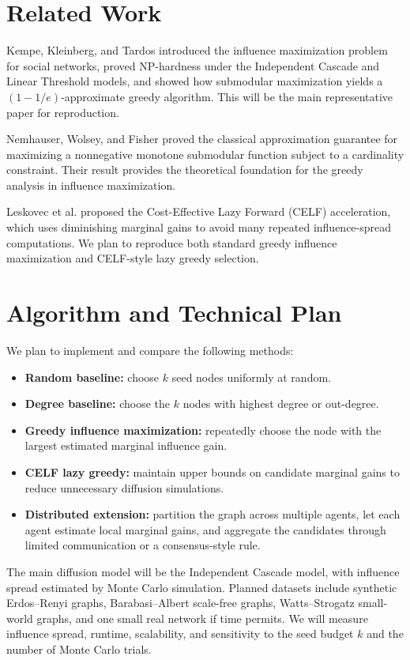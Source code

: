 \documentclass[10pt]{article}
\begin{document}
\section{Related Work}

Kempe, Kleinberg, and Tardos introduced the influence maximization problem for
social networks, proved NP-hardness under the Independent Cascade and Linear
Threshold models, and showed how submodular maximization yields a
$(1-1/e)$-approximate greedy algorithm. This will be the main representative
paper for reproduction.

Nemhauser, Wolsey, and Fisher proved the classical approximation guarantee for
maximizing a nonnegative monotone submodular function subject to a cardinality
constraint. Their result provides the theoretical foundation for the greedy
analysis in influence maximization.

Leskovec et al. proposed the Cost-Effective Lazy Forward (CELF) acceleration,
which uses diminishing marginal gains to avoid many repeated influence-spread
computations. We plan to reproduce both standard greedy influence maximization
and CELF-style lazy greedy selection.

\section{Algorithm and Technical Plan}

We plan to implement and compare the following methods:
\begin{itemize}
    \item \textbf{Random baseline:} choose $k$ seed nodes uniformly at random.
    \item \textbf{Degree baseline:} choose the $k$ nodes with highest degree or
    out-degree.
    \item \textbf{Greedy influence maximization:} repeatedly choose the node
    with the largest estimated marginal influence gain.
    \item \textbf{CELF lazy greedy:} maintain upper bounds on candidate
    marginal gains to reduce unnecessary diffusion simulations.
    \item \textbf{Distributed extension:} partition the graph across multiple
    agents, let each agent estimate local marginal gains, and aggregate the
    candidates through limited communication or a consensus-style rule.
\end{itemize}

The main diffusion model will be the Independent Cascade model, with influence
spread estimated by Monte Carlo simulation. Planned datasets include synthetic
Erdos--Renyi graphs, Barabasi--Albert scale-free graphs, Watts--Strogatz
small-world graphs, and one small real network if time permits. We will measure
influence spread, runtime, scalability, and sensitivity to the seed budget $k$
and the number of Monte Carlo trials.
\end{document}
